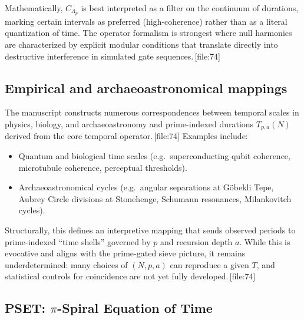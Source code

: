 \documentclass[11pt]{article}
\begin{document}
Mathematically, \(C_{\Lambda_p}\) is best interpreted as a filter on the continuum of durations, marking certain intervals as preferred (high-coherence) rather than as a literal quantization of time. The operator formalism is strongest where null harmonics are characterized by explicit modular conditions that translate directly into destructive interference in simulated gate sequences.\,[file:74]

\subsection{Empirical and archaeoastronomical mappings}

The manuscript constructs numerous correspondences between temporal scales in physics, biology, and archaeoastronomy and prime-indexed durations \(T_{p,a}(N)\) derived from the core temporal operator.\,[file:74] Examples include:
\begin{itemize}
  \item Quantum and biological time scales (e.g.\ superconducting qubit coherence, microtubule coherence, perceptual thresholds).
  \item Archaeoastronomical cycles (e.g.\ angular separations at G\"obekli Tepe, Aubrey Circle divisions at Stonehenge, Schumann resonances, Milankovitch cycles).
\end{itemize}

Structurally, this defines an interpretive mapping that sends observed periods to prime-indexed ``time shells'' governed by \(p\) and recursion depth \(a\). While this is evocative and aligns with the prime-gated sieve picture, it remains underdetermined: many choices of \((N,p,a)\) can reproduce a given \(T\), and statistical controls for coincidence are not yet fully developed.\,[file:74]

\subsection{PSET: \(\pi\)-Spiral Equation of Time}
\end{document}
